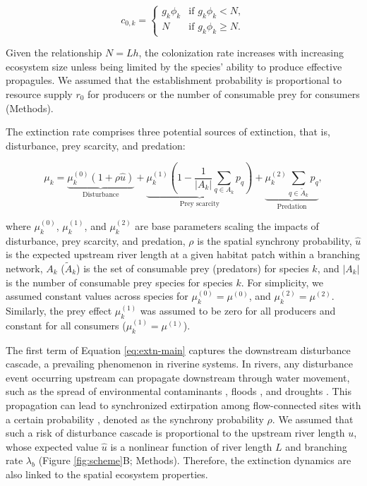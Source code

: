 \documentclass[11pt, class=article, crop=false]{standalone}
\begin{document}
\begin{equation}
    c_{0, k} = 
    \begin{cases}
        g_k \phi_k & \text{if $g_k \phi_k < N$},\\
        N & \text{if $g_k \phi_k \ge N$}.
    \end{cases}
    \label{eq:c0-prod}
\end{equation}

Given the relationship $N = Lh$, the colonization rate increases with increasing ecosystem size unless being limited by the species' ability to produce effective propagules.
We assumed that the establishment probability is proportional to resource supply $r_0$ for producers or the number of consumable prey for consumers (Methods).

The extinction rate comprises three potential sources of extinction, that is, disturbance, prey scarcity, and predation:

\begin{equation}
    \mu_{k} = 
        \underbrace{\mu_{k}^{(0)} (1 + \rho \hat{u})}_{\text{Disturbance}} + 
        \underbrace{\mu_{k}^{(1)} \left(1 - \frac{1}{|A_{k}|}\sum_{q\in A_{k}} p_{q} \right)}_{\text{Prey scarcity}} + 
        \underbrace{\mu_{k}^{(2)} \sum_{q \in \tilde{A}_{k}} p_{q}}_{\text{Predation}},
    \label{eq:extn-main}    
\end{equation}

where $\mu_k^{(0)}$, $\mu_k^{(1)}$, and $\mu_k^{(2)}$ are base parameters scaling the impacts of disturbance, prey scarcity, and predation, $\rho$ is the spatial synchrony probability, $\hat{u}$ is the expected upstream river length at a given habitat patch within a branching network, $A_{k}$ ($\tilde{A}_{k}$) is the set of consumable prey (predators) for species $k$, and $|A_{k}|$ is the number of consumable prey species for species $k$.
For simplicity, we assumed constant values across species for $\mu_k^{(0)} = \mu^{(0)}$, and $\mu_k^{(2)} = \mu^{(2)}$.
Similarly, the prey effect $\mu_k^{(1)}$ was assumed to be zero for all producers and constant for all consumers ($\mu_k^{(1)} = \mu^{(1)}$).

The first term of Equation \ref{eq:extn-main}
captures the downstream disturbance cascade, a prevailing phenomenon in riverine systems.
In rivers, any disturbance event occurring upstream can propagate downstream through water movement, such as the spread of environmental contaminants \citep{massoudieh_biogeochemical_2010}, floods \citep{swanson_flood_1998, nakamura_disturbance_2000}, and droughts \citep{sarremejane_drought_2021}.
This propagation can lead to synchronized extirpation among flow-connected sites with a certain probability \citep{larsen_geography_2021, sarremejane_drought_2021}, denoted as the synchrony probability $\rho$. 
We assumed that such a risk of disturbance cascade is proportional to the upstream river length $u$, whose expected value $\hat{u}$ is a nonlinear function of river length $L$ and branching rate $\lambda_b$ (Figure \ref{fig:scheme}B; Methods).
Therefore, the extinction dynamics are also linked to the spatial ecosystem properties.
\end{document}
